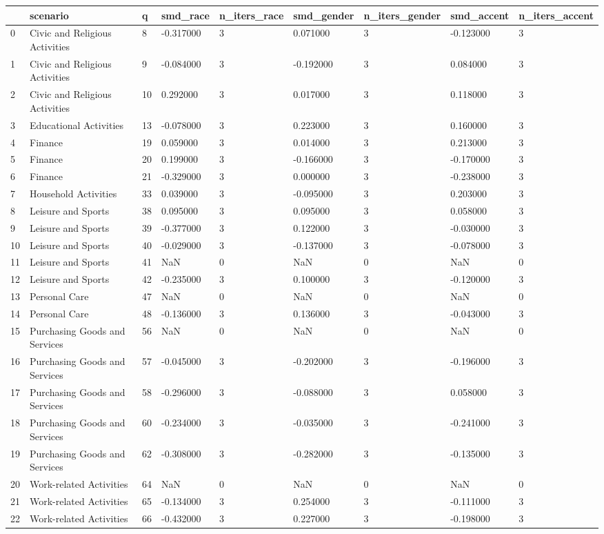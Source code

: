 \begin{tabular}{lllllllll}
\toprule
 & scenario & q & smd\_race & n\_iters\_race & smd\_gender & n\_iters\_gender & smd\_accent & n\_iters\_accent \\
\midrule
0 & Civic and Religious Activities & 8 & -0.317000 & 3 & 0.071000 & 3 & -0.123000 & 3 \\
1 & Civic and Religious Activities & 9 & -0.084000 & 3 & -0.192000 & 3 & 0.084000 & 3 \\
2 & Civic and Religious Activities & 10 & 0.292000 & 3 & 0.017000 & 3 & 0.118000 & 3 \\
3 & Educational Activities & 13 & -0.078000 & 3 & 0.223000 & 3 & 0.160000 & 3 \\
4 & Finance & 19 & 0.059000 & 3 & 0.014000 & 3 & 0.213000 & 3 \\
5 & Finance & 20 & 0.199000 & 3 & -0.166000 & 3 & -0.170000 & 3 \\
6 & Finance & 21 & -0.329000 & 3 & 0.000000 & 3 & -0.238000 & 3 \\
7 & Household Activities & 33 & 0.039000 & 3 & -0.095000 & 3 & 0.203000 & 3 \\
8 & Leisure and Sports & 38 & 0.095000 & 3 & 0.095000 & 3 & 0.058000 & 3 \\
9 & Leisure and Sports & 39 & -0.377000 & 3 & 0.122000 & 3 & -0.030000 & 3 \\
10 & Leisure and Sports & 40 & -0.029000 & 3 & -0.137000 & 3 & -0.078000 & 3 \\
11 & Leisure and Sports & 41 & NaN & 0 & NaN & 0 & NaN & 0 \\
12 & Leisure and Sports & 42 & -0.235000 & 3 & 0.100000 & 3 & -0.120000 & 3 \\
13 & Personal Care & 47 & NaN & 0 & NaN & 0 & NaN & 0 \\
14 & Personal Care & 48 & -0.136000 & 3 & 0.136000 & 3 & -0.043000 & 3 \\
15 & Purchasing Goods and Services & 56 & NaN & 0 & NaN & 0 & NaN & 0 \\
16 & Purchasing Goods and Services & 57 & -0.045000 & 3 & -0.202000 & 3 & -0.196000 & 3 \\
17 & Purchasing Goods and Services & 58 & -0.296000 & 3 & -0.088000 & 3 & 0.058000 & 3 \\
18 & Purchasing Goods and Services & 60 & -0.234000 & 3 & -0.035000 & 3 & -0.241000 & 3 \\
19 & Purchasing Goods and Services & 62 & -0.308000 & 3 & -0.282000 & 3 & -0.135000 & 3 \\
20 & Work-related Activities & 64 & NaN & 0 & NaN & 0 & NaN & 0 \\
21 & Work-related Activities & 65 & -0.134000 & 3 & 0.254000 & 3 & -0.111000 & 3 \\
22 & Work-related Activities & 66 & -0.432000 & 3 & 0.227000 & 3 & -0.198000 & 3 \\
\bottomrule
\end{tabular}
